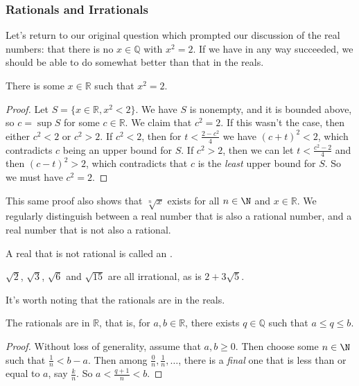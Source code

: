 \documentclass[a4paper]{scrartcl}
\begin{document}
\subsubsection{Rationals and Irrationals}

Let's return to our original question which prompted our discussion of the real numbers: that there is no $x \in \mathbb{Q}$ with $x^2 = 2$. If we have in any way succeeded, we should be able to do somewhat better than that in the reals. 

\begin{proposition}
	There is some $x \in \mathbb{R}$ such that $x^2 = 2$.
\end{proposition}
\begin{proof}
	Let $S = \{x \in \mathbb{R}, x^2 < 2\}$. We have $S$ is nonempty, and it is bounded above, so $c = \sup S$ for some $c \in \mathbb{R}$. We claim that $c^2 = 2$. If this wasn't the case, then either $c^2 < 2$ or $c^2 > 2$. If $c^2 < 2$, then for $t < \frac{2 - c^2}{4}$ we have $(c + t)^2 < 2$, which contradicts $c$ being an upper bound for $S$. If $c^2 > 2$, then we can let $t < \frac{c^2 - 2}{4}$ and then $(c - t)^2 > 2$, which contradicts that $c$ is the \emph{least} upper bound for $S$. So we must have $c^2 = 2$.
\end{proof}

This same proof also shows that $\sqrt[n]{x}$ exists for all $n \in \N$ and $x \in \mathbb{R}$. 
We regularly distinguish between a real number that is also a rational number, and a real number that is not also a rational.

\begin{definition}
	A real that is not rational is called an .
\end{definition}


\begin{example}
	$\sqrt{2}$, $\sqrt{3}$, $\sqrt{6}$ and $\sqrt{15}$ are all irrational, as is $2 + 3\sqrt{5}$.
\end{example}

It's worth noting that the rationals are  in the reals.

\begin{theorem}
		The rationals are  in $\mathbb{R}$, that is, for $a, b \in \mathbb{R}$, there exists $q \in \mathbb{Q}$ such that $a \leq q \leq b$.
\end{theorem}
\begin{proof}
	Without loss of generality, assume that $a, b \geq 0$. Then choose some $n \in \N$ such that $\frac{1}{n} < b - a$. Then among
	$\frac{0}{n}, \frac{1}{n}, \dots$, there is a \emph{final} one that is less than or equal to $a$, say $\frac{k}{n}$. So $a < \frac{q + 1}{n} < b$.
\end{proof}
\end{document}
